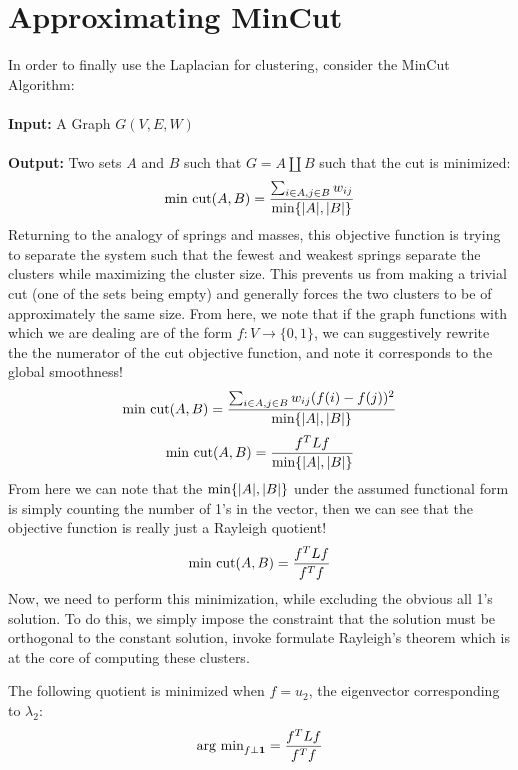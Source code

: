 \section{Approximating MinCut}
In order to finally use the Laplacian for clustering, consider the
MinCut Algorithm: 
\\\\
\noindent
\textbf{Input:} A Graph \(G(V, E, W)\)
\\\\
\noindent
\textbf{Output:} Two sets \(A\) and \(B\) such that \(G = A \coprod
B\) such that the cut is minimized: 
\[
\textnormal{min cut}(A,B) = \frac{\sum_{i \in A, j\in B}
  w_{ij}}{\textnormal{min} \{|A|, |B|\} } 
\]
Returning to the analogy of springs and masses, this objective
function is trying to separate the system such that the fewest and
weakest springs separate the clusters while maximizing the cluster
size. This prevents us from making a trivial cut (one of the sets
being empty) and generally forces the two clusters to be of
approximately the same size. From here, we note that if the graph
functions with which we are dealing are of the form \(f: V \rightarrow
\{0,1\}\), we can suggestively rewrite the the numerator of the cut
objective function, and note it corresponds to the global smoothness! 
\[
\textnormal{min cut}(A,B) = \frac{\sum_{i \in A, j\in B} w_{ij} (f(i)
  - f(j))^2}{\textnormal{min} \{|A|, |B|\} } 
\]
\[
\textnormal{min cut}(A,B) = \frac{f^TLf}{\textnormal{min} \{|A|, |B|\} }
\]
From here we can note that the \(\textnormal{min} \{|A|, |B|\}\) under
the assumed functional form is simply counting the number of 1's in
the vector, then we can see that the objective function is really just
a Rayleigh quotient! 
\[
\textnormal{min cut}(A,B) = \frac{f^TLf}{f^Tf }
\]
Now, we need to perform this minimization, while excluding the obvious
all 1's solution. To do this, we simply impose the constraint that the
solution must be orthogonal to the constant solution, invoke formulate
Rayleigh's theorem which is at the core of computing these clusters. 
\begin{theorem}
The following quotient is minimized when \(f = u_2\), the eigenvector
corresponding to \(\lambda_2\): 
\[
\textnormal{arg min}_{f \perp \mathbf{1}} = \frac{f^TLf}{f^Tf }
\]
\end{theorem}

